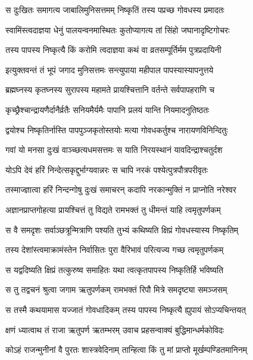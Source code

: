 \twolineshloka
{स दुःखितः समागत्य जाबालिमुनिसत्तमम्}
{निष्कृतिं तस्य पप्रच्छ गोवधस्य प्रमादतः}%


\twolineshloka
{स्वामिंस्त्वदाज्ञया धेनुं पालयन्वनमास्थितः}
{कुतोप्यागत्य तां सिंहो जघानादृष्टिगोचरः}%

\twolineshloka
{तस्य पापस्य निष्कृत्यै किं करोमि त्वदाज्ञया}
{कथं वा व्रतसम्पूर्तिर्मम पुत्रप्रदायिनी}%

\twolineshloka
{इत्युक्तवन्तं तं भूपं जगाद मुनिसत्तमः}
{सन्त्युपाया महीपाल पापस्यास्यापनुत्तये}%

\twolineshloka
{ब्रह्मघ्नस्य कृतघ्नस्य सुरापस्य महामते}
{प्रायश्चित्तानि वर्तन्ते सर्वपापहराणि च}%

\twolineshloka
{कृच्छ्रैश्चान्द्रायणैर्दानैर्व्रतैः सनियमैर्यमैः}
{पापानि प्रलयं यान्ति नियमादनुतिष्ठतः}%

\twolineshloka
{द्वयोश्च निष्कृतिर्नास्ति पापपुञ्जकृतोस्तयोः}
{मत्या गोवधकर्तुश्च नारायणविनिन्दितुः}%

\twolineshloka
{गवां यो मनसा दुःखं वाञ्च्छत्यधमसत्तमः}
{स याति निरयस्थानं यावदिन्द्राश्चतुर्दश}%

\twolineshloka
{योऽपि देवं हरिं निन्देत्सकृद्दुर्भाग्यवान्नरः}
{स चापि नरकं पश्येत्पुत्रपौत्रपरीवृतः}%

\twolineshloka
{तस्माज्ज्ञात्वा हरिं निन्दन्गोषु दुःखं समाचरन्}
{कदापि नरकान्मुक्तिं न प्राप्नोति नरेश्वर}%

\twolineshloka
{अज्ञानप्राप्तगोहत्या प्रायश्चित्तं तु विद्यते}
{रामभक्तं तु धीमन्तं याहि त्वमृतुपर्णकम्}%

\twolineshloka
{स वै समदृशः सर्वाञ्छत्रून्मित्राणि पश्यति}
{तुभ्यं कथिष्यति क्षिप्रं गोवधस्यास्य निष्कृतिम्}%

\twolineshloka
{तस्य देशांस्त्वमाक्रामंस्तेन निर्वासितः पुरा}
{वैरिभावं परित्यज्य गच्छ त्वमृतुपर्णकम्}%

\twolineshloka
{स यद्वदिष्यति क्षिप्रं तत्कुरुष्व समाहितः}
{यथा त्वत्कृतपापस्य निष्कृतिर्हि भविष्यति}%

\twolineshloka
{स तु तद्वचनं श्रुत्वा जगाम ऋतुपर्णकम्}
{रामभक्तं रिपौ मित्रे समदृष्ट्या समञ्जसम्}%

\twolineshloka
{स तस्मै कथयामास यज्जातं गोवधादिकम्}
{तस्य पापस्य निष्कृत्यै ह्युपायं सोऽप्यचिन्तयत्}%

\twolineshloka
{क्षणं ध्यात्वाथ तं राजा ऋतुपर्ण ऋतम्भरम्}
{उवाच प्रहसन्वाक्यं बुद्धिमान्धर्मकोविदः}%

\twolineshloka
{कोऽहं राजन्मुनीनां वै पुरतः शास्त्रवेदिनाम्}
{तान्हित्वा किं तु मां प्राप्तो मूर्खम्पण्डितमानिनम्}%

